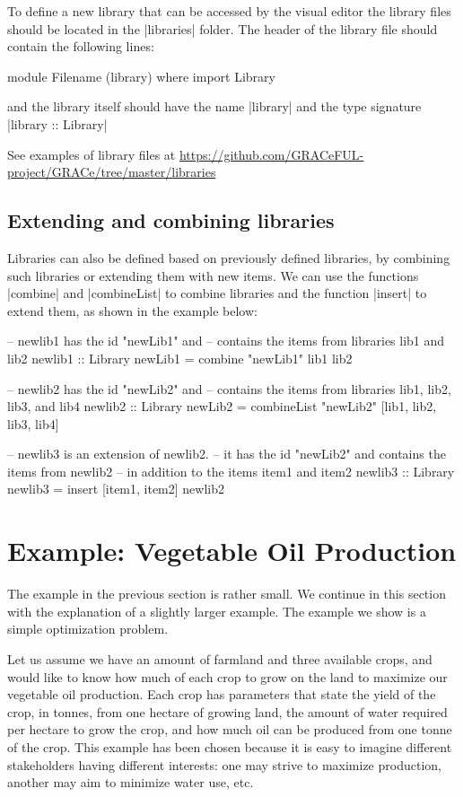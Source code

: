 \documentclass[a4paper]{article}
\begin{document}
To define a new library that can be accessed by the visual editor the library
files should be located in the |libraries| folder.
The header of the library file should contain the following lines:
\begin{haskellcode}
    module Filename (library) where
    import Library
\end{haskellcode}
and the library itself should have the name |library| and the type signature
|library :: Library|

See examples of library files at \url{https://github.com/GRACeFUL-project/GRACe/tree/master/libraries}

\subsection{Extending and combining libraries}
Libraries can also be defined based on previously defined libraries, by
combining such libraries or extending them with new items.
We can use the functions |combine| and |combineList| to combine libraries and
the function |insert| to extend them, as shown in the example below:

\begin{haskellcode}
-- newlib1 has the id "newLib1" and 
-- contains the items from libraries lib1 and lib2
newlib1 :: Library
newLib1 = combine "newLib1" lib1 lib2

-- newlib2 has the id "newLib2" and 
-- contains the items from libraries lib1, lib2, lib3, and lib4
newlib2 :: Library
newLib2 = combineList "newLib2" [lib1, lib2, lib3, lib4]

-- newlib3 is an extension of newlib2.
-- it has the id "newLib2" and contains the items from newlib2
-- in addition to the items item1 and item2
newlib3 :: Library
newlib3 = insert [item1, item2] newlib2
\end{haskellcode}

\section{Example: Vegetable Oil Production}

The example in the previous section is rather small. We continue in this section
with the explanation of a slightly larger example. The example we show is a
simple optimization problem.

Let us assume we have an amount of farmland and three available crops, and would
like to know how much of each crop to grow on the land to maximize our vegetable
oil production. Each crop has parameters that state the yield of the crop, in
tonnes, from one hectare of growing land, the amount of water required per
hectare to grow the crop, and how much oil can be produced from one tonne of the
crop.
%
This example has been chosen because it is easy to imagine different
stakeholders having different interests: one may strive to maximize
production, another may aim to minimize water use, etc.
\end{document}
